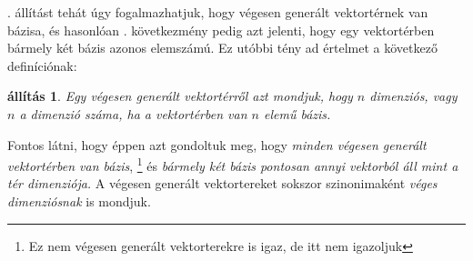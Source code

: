 \documentclass[9pt, showtrims]{memoir}
\let\Aref\relax
\theoremstyle{plain}
\newtheorem{proposition}{állítás}[section]
\theoremstyle{remark}
\theoremstyle{definition}
\begin{document}
\Aref{pr:bazisletezik}. állítást tehát úgy fogalmazhatjuk, hogy végesen generált vektortérnek van bázisa,
és hasonlóan . következmény pedig azt jelenti, 
hogy egy vektortérben bármely két bázis azonos elemszámú.
Ez utóbbi tény ad értelmet a következő definíciónak:
\begin{proposition}
    Egy végesen generált vektortérről azt mondjuk, hogy $n$ dimenziós, vagy $n$ a dimenzió száma,
    ha a vektortérben van $n$ elemű bázis.
\end{proposition}
Fontos látni, hogy éppen azt gondoltuk meg, hogy \emph{minden végesen generált vektortérben van bázis}, 
\footnote{Ez nem végesen generált vektorterekre is igaz, de itt nem igazoljuk}
és \emph{bármely két bázis pontosan annyi vektorból áll mint a tér dimenziója.}
A végesen generált vektortereket sokszor szinonimaként \emph{véges dimenziósnak} is mondjuk.
\end{document}
